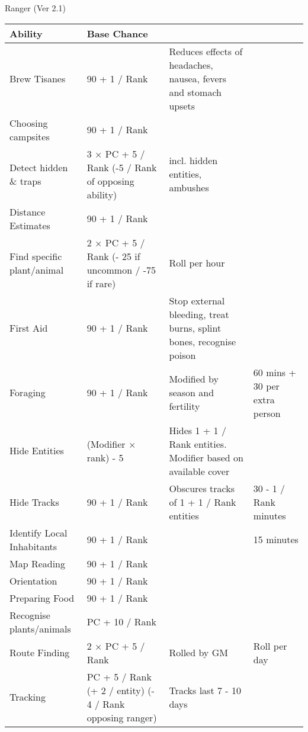 \begin{Chapter}{Ranger (Ver 2.1)}
\begin{table*}[t]
\begin{tabularx}{\textwidth}{|l|X|X|l|} \hline
Ability 		& Base Chance		& 			& \\ \hline
Brew Tisanes		& 90 + 1 / Rank 	& Reduces effects of headaches, nausea, fevers and stomach upsets & \\ \hline
Choosing campsites 	& 90 + 1 / Rank		& 			& \\ \hline
Detect hidden \& traps	& 3 × PC + 5 / Rank (-5 / Rank of opposing ability) & incl. hidden entities, ambushes & \\ \hline
Distance Estimates	& 90 + 1 / Rank		&			& \\ \hline
Find specific plant/animal & 2 × PC + 5 / Rank (- 25 if uncommon / -75 if rare) & Roll per hour  & \\ \hline
First Aid 		& 90 + 1 / Rank		& Stop external bleeding, treat burns, splint bones, recognise poison & \\ \hline
Foraging		& 90 + 1 / Rank		& Modified by season and fertility & 60 mins + 30 per extra person  \\ \hline
Hide Entities		& (Modifier × rank) - 5 & Hides 1 + 1 / Rank entities. Modifier based on available cover & \\ \hline
Hide Tracks		& 90 + 1 / Rank 	& Obscures tracks of 1 + 1 / Rank entities & 30 - 1 / Rank minutes \\ \hline
Identify Local Inhabitants &  90 + 1 / Rank	& 			& 15 minutes \\ \hline
Map Reading		& 90 + 1 / Rank		&			& \\ \hline
Orientation		& 90 + 1 / Rank		&			& \\ \hline
Preparing Food		& 90 + 1 / Rank		&			& \\ \hline
Recognise plants/animals & PC + 10 / Rank	&			& \\ \hline
Route Finding		& 2 × PC + 5 / Rank	& Rolled by GM		& Roll per day \\ \hline
Tracking		& PC + 5 / Rank (+ 2 / entity) (- 4 / Rank opposing ranger) & Tracks last 7 - 10 days & \\ \hline
\end{tabularx}

\end{table*}

\end{Chapter}
